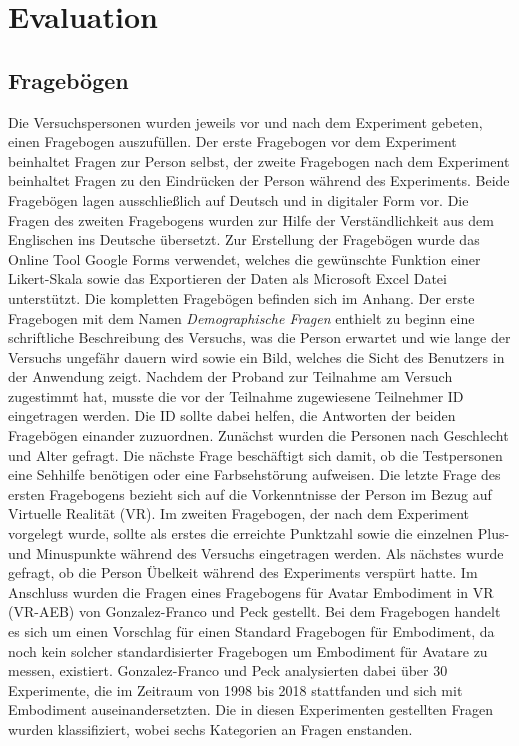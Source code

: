 \chapter{Evaluation}

\section{Fragebögen}
Die Versuchspersonen wurden jeweils vor und nach dem Experiment gebeten, einen Fragebogen auszufüllen. Der erste Fragebogen vor dem Experiment beinhaltet Fragen zur Person selbst, der zweite Fragebogen nach dem Experiment beinhaltet Fragen zu den Eindrücken der Person während des Experiments. Beide Fragebögen lagen ausschließlich auf Deutsch und in digitaler Form vor. Die Fragen des zweiten Fragebogens wurden zur Hilfe der Verständlichkeit aus dem Englischen ins Deutsche übersetzt. Zur Erstellung der Fragebögen wurde das Online Tool Google Forms verwendet, welches die gewünschte Funktion einer Likert-Skala sowie das Exportieren der Daten als Microsoft Excel Datei unterstützt. Die kompletten Fragebögen befinden sich im Anhang.
Der erste Fragebogen mit dem Namen \textit{Demographische Fragen} enthielt zu beginn eine schriftliche Beschreibung des Versuchs, was die Person erwartet und wie lange der Versuchs ungefähr dauern wird sowie ein Bild, welches die Sicht des Benutzers in der Anwendung zeigt. Nachdem der Proband zur Teilnahme am Versuch zugestimmt hat, musste die vor der Teilnahme zugewiesene Teilnehmer ID eingetragen werden. Die ID sollte dabei helfen, die Antworten der beiden Fragebögen einander zuzuordnen. Zunächst wurden die Personen nach Geschlecht und Alter gefragt. Die nächste Frage beschäftigt sich damit, ob die Testpersonen eine Sehhilfe benötigen oder eine Farbsehstörung aufweisen. Die letzte Frage des ersten Fragebogens bezieht sich auf die Vorkenntnisse der Person im Bezug auf Virtuelle Realität (VR). 
Im zweiten Fragebogen, der nach dem Experiment vorgelegt wurde, sollte als erstes die erreichte Punktzahl sowie die einzelnen Plus- und Minuspunkte während des Versuchs eingetragen werden. Als nächstes wurde gefragt, ob die Person Übelkeit während des Experiments verspürt hatte.
Im Anschluss wurden die Fragen eines Fragebogens für Avatar Embodiment in VR (VR-AEB) von Gonzalez-Franco und Peck \cite{Gonzalez-Franco2018} gestellt. Bei dem Fragebogen handelt es sich um einen Vorschlag für einen Standard Fragebogen für Embodiment, da noch kein solcher standardisierter Fragebogen um Embodiment für Avatare zu messen, existiert. Gonzalez-Franco und Peck analysierten dabei über 30 Experimente, die im Zeitraum von 1998 bis 2018 stattfanden und sich mit Embodiment auseinandersetzten. Die in diesen Experimenten gestellten Fragen wurden klassifiziert, wobei sechs Kategorien an Fragen enstanden.
